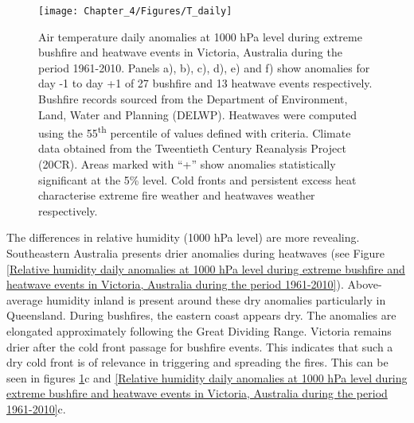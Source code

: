 \begin{figure}[h]
\noindent \begin{centering}
\texttt{[image: Chapter\_4/Figures/T\_daily]}
\par\end{centering}

\caption[Air temperature daily anomalies at 1000 hPa level during extreme bushfire
and heatwave events in Victoria, Australia during the period 1961-2010]{Air temperature daily anomalies at 1000 hPa level during extreme bushfire
and heatwave events in Victoria, Australia during the period 1961-2010.
Panels a), b), c), d), e) and f) show anomalies for day -1 to day
+1 of 27 bushfire and 13 heatwave events respectively. Bushfire records
sourced from the Department of Environment, Land, Water and Planning
(DELWP). Heatwaves were computed using the 55\protect\textsuperscript{th}
percentile of values defined with \citet{Nairn2009} criteria. Climate
data obtained from the Tweentieth Century Reanalysis Project (20CR).
Areas marked with ``+'' show anomalies statistically significant
at the 5\% level. Cold fronts and persistent excess heat characterise
extreme fire weather and heatwaves weather respectively. \label{fig: Air temperature daily anomalies at 1000 hPa level during extreme bushfire and heatwave events in Victoria, Australia during the period 1961-2010}}


\end{figure}
 

The differences in relative humidity (1000 hPa level) are more revealing.
Southeastern Australia presents drier anomalies during heatwaves (see
Figure \ref{Relative humidity daily anomalies at 1000 hPa level during extreme bushfire and heatwave events in Victoria, Australia during the period 1961-2010}).
Above-average humidity inland is present around these dry anomalies
particularly in Queensland. During bushfires, the eastern coast appears
dry. The anomalies are elongated approximately following the Great
Dividing Range. Victoria remains drier after the cold front passage
for bushfire events. This indicates that such a dry cold front is
of relevance in triggering and spreading the fires. This can be seen
in figures \ref{fig: Air temperature daily anomalies at 1000 hPa level during extreme bushfire and heatwave events in Victoria, Australia during the period 1961-2010}c
and \ref{Relative humidity daily anomalies at 1000 hPa level during extreme bushfire and heatwave events in Victoria, Australia during the period 1961-2010}c. 

